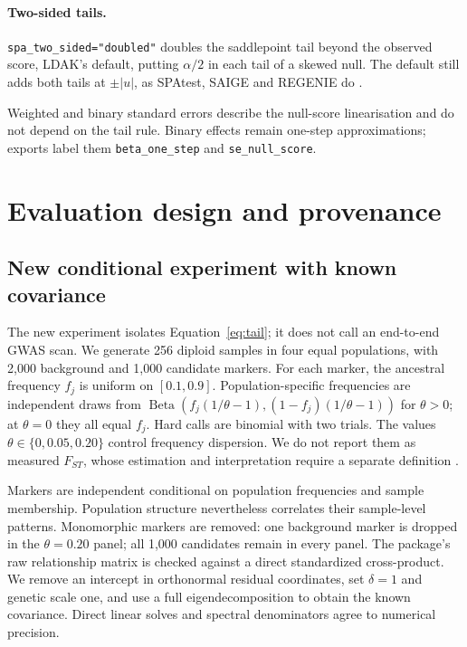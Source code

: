 \documentclass[11pt]{article}
\newcommand{\code}[1]{\texttt{#1}}
\begin{document}
\paragraph{Two-sided tails.}
\code{spa\_two\_sided="doubled"} doubles the saddlepoint tail beyond the
observed score, LDAK's default, putting $\alpha/2$ in each tail of a skewed
null. The default still adds both tails at $\pm|u|$, as SPAtest, SAIGE and
REGENIE do \citep{dey2017,zhou2018,mbatchou2021}.

Weighted and binary standard errors describe the
null-score linearisation and do not depend on the tail rule. Binary effects
remain one-step approximations; exports label them \code{beta\_one\_step}
and \code{se\_null\_score}.

\section{Evaluation design and provenance}
\label{sec:evaluation}

\subsection{New conditional experiment with known covariance}
\label{sec:newdesign}

The new experiment isolates Equation~\eqref{eq:tail}; it does not call
an end-to-end GWAS scan. We generate 256 diploid samples in four equal
populations, with 2,000 background and 1,000 candidate markers. For each
marker, the ancestral frequency $f_j$ is uniform on $[0.1,0.9]$.
Population-specific frequencies are independent draws from
$\operatorname{Beta}(f_j(1/\theta-1),(1-f_j)(1/\theta-1))$ for
$\theta>0$; at $\theta=0$ they all equal $f_j$.
Hard calls are binomial with two trials. The values
$\theta\in\{0,0.05,0.20\}$ control frequency dispersion. We do not
report them as measured $F_{ST}$, whose estimation and interpretation
require a separate definition \citep{bhatia2013}.

Markers are independent conditional on population frequencies and sample
membership. Population structure nevertheless correlates their
sample-level patterns. Monomorphic markers are removed: one background
marker is dropped in the $\theta=0.20$ panel; all 1,000 candidates
remain in every panel. The package's raw relationship matrix is checked
against a direct standardized cross-product. We remove an intercept in
orthonormal residual coordinates, set $\delta=1$ and genetic scale one,
and use a full eigendecomposition to obtain the known covariance.
Direct linear solves and spectral denominators agree to numerical
precision.
\end{document}
